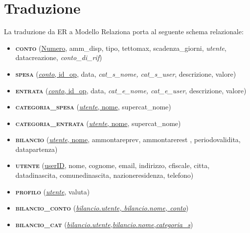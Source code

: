 \documentclass[a4paper,10pt]{article}
\newcommand{\entita}[1]{\textsc{\textbf{#1}}}
\newcommand{\attr}[1]{\textsf{#1}}
\newcommand{\key}[1]{\uline{#1}}
\newcommand{\fkey}[1]{\textit{#1}}
\begin{document}
\section{Traduzione}
La traduzione da ER a Modello Relaziona porta al seguente schema relazionale:
\begin{itemize}
\item[]\entita{conto} (\attr{\key{Numero}}, \attr{amm\_{}disp}, \attr{tipo}, \attr{tettomax}, \attr{scadenza\_{}giorni}, \attr{\fkey{utente}}, \attr{datacreazione}, \attr{\fkey{conto\_{}di\_{}rif}})

\item[]\entita{spesa} (\attr{\key{\fkey{conto}, id\_{}op}},  \attr{data, \fkey{cat\_{}s\_{}nome, cat\_{}s\_{}user}, descrizione, valore})

\item[]\entita{entrata} (\attr{\key{\fkey{conto}, id\_{}op}},  \attr{data, \fkey{cat\_{}e\_{}nome, cat\_{}e\_{}user}, descrizione, valore})

\item[]\entita{categoria\_{}spesa} (\attr{\key{\fkey{utente}, nome}, supercat\_{}nome})
\item[]\entita{categoria\_{}entrata} (\attr{\key{\fkey{utente}, nome}, supercat\_{}nome})

\item[]\entita{bilancio} (\attr{\key{\fkey{utente}, nome}, ammontareprev, ammontarerest , periodovalidita, datapartenza})

\item[]\entita{utente} (\attr{\key{userID}, nome, cognome, email, indirizzo, cfiscale, citta, datadinascita, comunedinascita, nazioneresidenza, telefono})

\item[]\entita{profilo} (\attr{\key{\fkey{utente}}, valuta})

\item[]\entita{bilancio\_{}conto} (\attr{\key{\fkey{bilancio.utente, bilancio.nome, conto}}})

\item[]\entita{bilancio\_{}cat} (\attr{\key{\fkey{bilancio.utente,bilancio.nome,categoria\_{}s}}})
\end{itemize}
\end{document}
